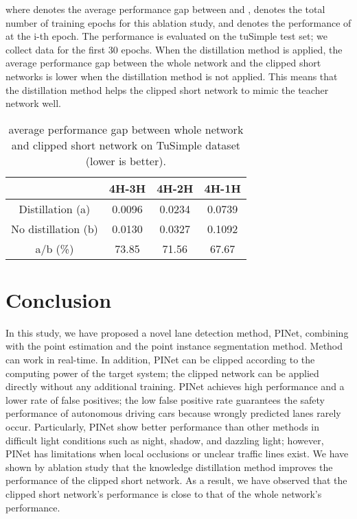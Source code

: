 \documentclass[journal]{IEEEtran}
\begin{document}
where  denotes the average performance gap between  and ,  denotes the total number of training epochs for this ablation study, and  denotes the performance of  at the i-th epoch. The performance is evaluated on the tuSimple test set; we collect data for the first 30 epochs. When the distillation method is applied, the average performance gap between the whole network and the clipped short networks is lower when the distillation method is not applied. This means that the distillation method helps the clipped short network to mimic the teacher network well. 

\begin{table}[ht]
    \caption{average performance gap between whole network and clipped short network on TuSimple dataset (lower is better).}
    \begin{center}
        \begin{tabular}{|c|c|c|c|}
            \hline
            & 4H-3H & 4H-2H & 4H-1H\\
            \hline
            \hline
            Distillation (a)& 0.0096 & 0.0234 & 0.0739\\
            \hline
            No distillation (b)& 0.0130 & 0.0327 & 0.1092\\
            \hline
            \hline
            a/b (\%)& 73.85 & 71.56 & 67.67\\
            \hline
        \end{tabular}
    \end{center}
\end{table}

\section{Conclusion}
In this study, we have proposed a novel lane detection method, PINet, combining with the point estimation and the point instance segmentation method. Method can work in real-time. In addition, PINet can be clipped according to the computing power of the target system; the clipped network can be applied directly without any additional training. PINet achieves high performance and a lower rate of false positives; the low false positive rate guarantees the safety performance of autonomous driving cars because wrongly predicted lanes rarely occur. Particularly, PINet show better performance than other methods in difficult light conditions such as night, shadow, and dazzling light; however, PINet has limitations when local occlusions or unclear traffic lines exist. We have shown by ablation study that the knowledge distillation method improves the performance of the clipped short network. As a result, we have observed that the clipped short network's performance is close to that of the whole network's performance. 
\end{document}
